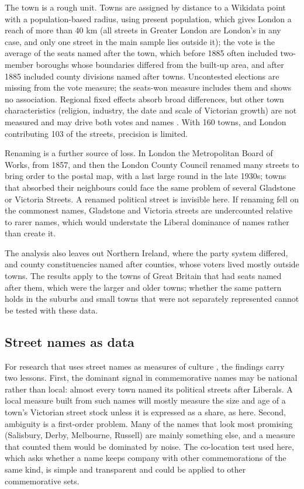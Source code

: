 \documentclass[11pt,a4paper]{article}
\begin{document}
The town is a rough unit. Towns are assigned by distance to a Wikidata point with a population-based radius, using present population, which gives London a reach of more than 40 km (all streets in Greater London are London's in any case, and only one street in the main sample lies outside it); the vote is the average of the seats named after the town, which before 1885 often included two-member boroughs whose boundaries differed from the built-up area, and after 1885 included county divisions named after towns. Uncontested elections are missing from the vote measure; the seats-won measure includes them and shows no association. Regional fixed effects absorb broad differences, but other town characteristics (religion, industry, the date and scale of Victorian growth) are not measured and may drive both votes and names \citep{wald1983,pelling1967}. With 160 towns, and London contributing 103 of the streets, precision is limited.

Renaming is a further source of loss. In London the Metropolitan Board of Works, from 1857, and then the London County Council renamed many streets to bring order to the postal map, with a last large round in the late 1930s; towns that absorbed their neighbours could face the same problem of several Gladstone or Victoria Streets. A renamed political street is invisible here. If renaming fell on the commonest names, Gladstone and Victoria streets are undercounted relative to rarer names, which would understate the Liberal dominance of names rather than create it.

The analysis also leaves out Northern Ireland, where the party system differed, and county constituencies named after counties, whose voters lived mostly outside towns. The results apply to the towns of Great Britain that had seats named after them, which were the larger and older towns; whether the same pattern holds in the suburbs and small towns that were not separately represented cannot be tested with these data.

\subsection{Street names as data}
For research that uses street names as measures of culture \citep{oto2018,gutierrez2022,bancilhon2021}, the findings carry two lessons. First, the dominant signal in commemorative names may be national rather than local: almost every town named its political streets after Liberals. A local measure built from such names will mostly measure the size and age of a town's Victorian street stock unless it is expressed as a share, as here. Second, ambiguity is a first-order problem. Many of the names that look most promising (Salisbury, Derby, Melbourne, Russell) are mainly something else, and a measure that counted them would be dominated by noise. The co-location test used here, which asks whether a name keeps company with other commemorations of the same kind, is simple and transparent and could be applied to other commemorative sets.
\end{document}
